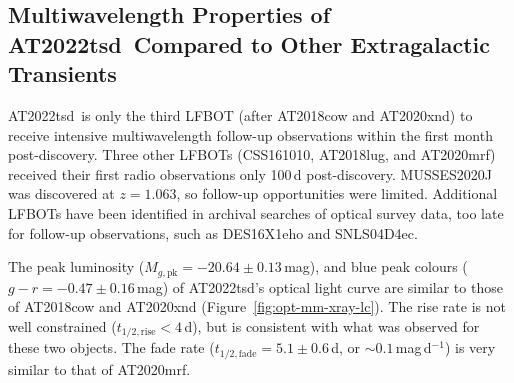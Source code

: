 \documentclass{nature_plusfigure}
\newcommand{\at}{AT2022tsd}
\begin{document}
\begin{methods}
\section{Multiwavelength Properties of \at\ Compared to Other Extragalactic Transients}
\label{sec:multiwavelength-properties}

\at\ is only the third LFBOT (after AT2018cow\cite{Prentice2018,Perley2019} and AT2020xnd\cite{Perley2021}) to receive intensive multiwavelength follow-up observations within the first month post-discovery.
Three other LFBOTs (CSS161010\cite{Coppejans2020}, AT2018lug\cite{Ho2020_Koala}, and AT2020mrf\cite{Yao2022}) received their first radio observations only 100\,d post-discovery. MUSSES2020J\cite{Jiang2022} was discovered at $z=1.063$, so follow-up opportunities were limited.
Additional LFBOTs have been identified in archival searches of optical survey data, too late for follow-up observations, such as DES16X1eho\cite{Pursiainen2018} and SNLS04D4ec\cite{Arcavi2016}. 

The peak luminosity ($M_{g,\mathrm{pk}}=-20.64\pm0.13$\,mag), and blue peak colours ($g-r=-0.47\pm0.16$\,mag) of \at's optical light curve are similar to those of AT2018cow\cite{Prentice2018,Perley2019} and AT2020xnd\cite{Perley2021} (Figure~\ref{fig:opt-mm-xray-lc}).
The rise rate is not well constrained ($t_{1/2,\mathrm{rise}}<4\,$d), but is consistent with what was observed for these two objects.
The fade rate ($t_{1/2,\mathrm{fade}}=5.1\pm0.6$\,d, or $\sim0.1\,$mag\,d$^{-1}$) is very similar to that of AT2020mrf\cite{Yao2022}.



\end{methods}
\end{document}
